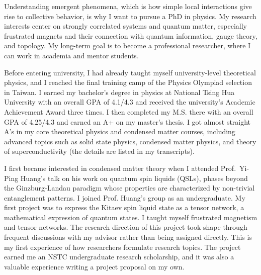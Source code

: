 Understanding emergent phenomena, which is how simple local interactions give rise to collective behavior, is why I want to pursue a PhD in physics. My research interests center on strongly correlated systems and quantum matter, especially frustrated magnets and their connection with quantum information, gauge theory, and topology. My long-term goal is to become a professional researcher, where I can work in academia and mentor students.

Before entering university, I had already taught myself university-level theoretical physics, and I reached the final training camp of the Physics Olympiad selection in Taiwan. I earned my bachelor's degree in physics at National Tsing Hua University with an overall GPA of 4.1/4.3 and received the university's Academic Achievement Award three times. I then completed my M.S. there with an overall GPA of 4.25/4.3 and earned an A+ on my master's thesis. I got almost straight A's in my core theoretical physics and condensed matter courses, including advanced topics such as solid state physics, condensed matter physics, and theory of superconductivity (the details are listed in my transcripts). 

I first became interested in condensed matter theory when I attended Prof.~Yi-Ping Huang's talk on his work on quantum spin liquids (QSLs), phases beyond the Ginzburg-Landau paradigm whose properties are characterized by non-trivial entanglement patterns. I joined Prof. Huang's group as an undergraduate. My first project was to express the Kitaev spin liquid state as a tensor network, a mathematical expression of quantum states. I taught myself frustrated magnetism and tensor networks. The research direction of this project took shape through frequent discussions with my advisor rather than being assigned directly. This is my first experience of how researchers formulate research topics. The project earned me an NSTC undergraduate research scholarship, and it was also a valuable experience writing a project proposal on my own.


